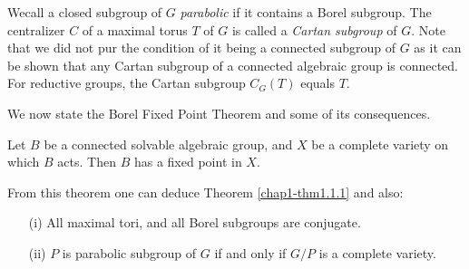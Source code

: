We\pageoriginale call a closed subgroup of $G$ {\em parabolic} if it
contains a Borel subgroup. The centralizer $C$ of a maximal torus $T$
of $G$ is called a {\em Cartan subgroup} of
$G$. Note that we did not 
pur the condition of it being a connected subgroup of $G$ as it can be
shown that any Cartan subgroup of a connected algebraic group is
connected. For reductive groups, the Cartan subgroup $C_{G}(T)$ equals
$T$.

\label{page3}
We now state the Borel Fixed Point Theorem and some of its consequences.

\begin{theorem}\label{chap1-thm1.1.2}
Let $B$ be a connected solvable algebraic group, and $X$ be a complete
variety on which $B$ acts. Then $B$ has a fixed point in $X$.
\end{theorem}

From this theorem one can deduce Theorem \ref{chap1-thm1.1.1} and
also:
\begin{itemize}
\item[(i)] All maximal tori, and all Borel subgroups are conjugate.

\item[(ii)] $P$ is parabolic subgroup of $G$ if and
  only if $G/P$ is a complete variety.
\end{itemize}


